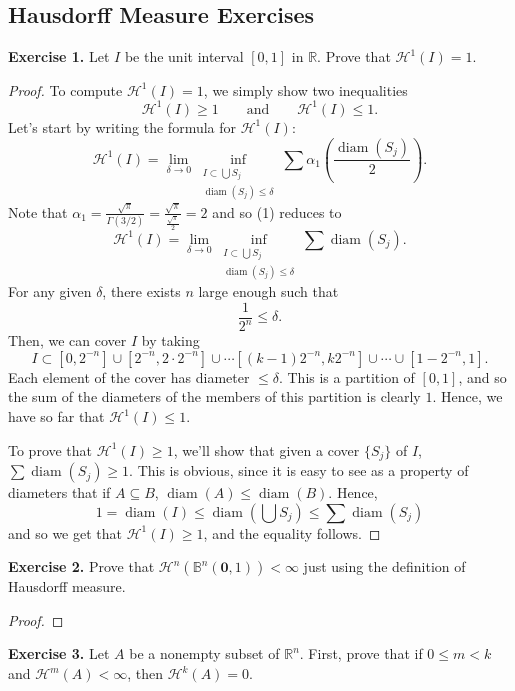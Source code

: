 \documentclass[10pt]{article}
\theoremstyle{plain}
\DeclareMathOperator{\diam}{diam}
\begin{document}
\subsection*{Hausdorff Measure Exercises}
	\noindent \textbf{Exercise 1.} Let $I$ be the unit interval $[0, 1]$ in $\mathbb{R}$. Prove that $\mathcal{H}^1(I) = 1$. 
		\begin{proof}
			To compute $\mathcal{H}^1(I) = 1$, we simply show two inequalities $$\mathcal{H}^1(I) \geq 1 \qquad \text{and} \qquad \mathcal{H}^1(I) \leq 1.$$ Let's start by writing the formula for $\mathcal{H}^1(I)$: \begin{equation} \mathcal{H}^1(I) = \lim_{\delta \to 0} \inf_{\substack{I \subset \bigcup S_j \\ \diam(S_j) \leq \delta}} \sum \alpha_1 \left(\frac{\diam(S_j)}{2}\right). \end{equation} 
		Note that $\alpha_1 = \frac{\sqrt{\pi}}{\Gamma(3/2)} = \frac{\sqrt{\pi}}{\frac{\sqrt{\pi}}{2}} = 2$ and so (1) reduces to $$\mathcal{H}^1(I) = \lim_{\delta \to 0} \inf_{\substack{I \subset \bigcup S_j \\ \diam(S_j) \leq \delta}} \sum \diam(S_j).$$ For any given $\delta$, there exists $n$ large enough such that $$\frac{1}{2^n} \leq \delta.$$ Then, we can cover $I$ by taking $$I \subset [0, 2^{-n}] \cup [2^{-n}, 2 \cdot 2^{-n}] \cup \cdots [(k - 1)2^{-n}, k 2^{-n}] \cup \cdots \cup [1 - 2^{-n}, 1].$$ Each element of the cover has diameter $\leq \delta$. This is a partition of $[0, 1]$, and so the sum of the diameters of the members of this partition is clearly $1$. Hence, we have so far that $\mathcal{H}^1(I) \leq 1$. 
		
		
		
		To prove that $\mathcal{H}^1(I) \geq 1$, we'll show that given a cover $\{S_j\}$ of $I$, $\sum \diam(S_j) \geq 1$. This is obvious, since it is easy to see as a property of diameters that if $A \subseteq B$, $\diam(A) \leq \diam(B)$. Hence, $$1 = \diam(I) \leq \diam\left(\bigcup S_j\right) \leq \sum \diam(S_j)$$ and so we get that $\mathcal{H}^1(I) \geq 1$, and the equality follows. 
		\end{proof}
	
	\noindent \textbf{Exercise 2.} Prove that $\mathcal{H}^n(\mathbb{B}^n(\mathbf{0}, 1)) < \infty$ just using the definition of Hausdorff measure.
		\begin{proof}
			
		\end{proof}
	
	\noindent \textbf{Exercise 3.} Let $A$ be a nonempty subset of $\mathbb{R}^n$. First, prove that if $0 \leq m < k$ and $\mathcal{H}^m(A) < \infty$, then $\mathcal{H}^k(A) = 0$. 
	
\end{document}
